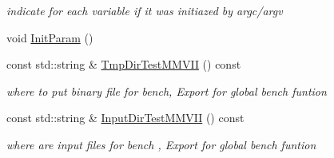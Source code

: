\begin{DoxyCompactItemize}
\begin{DoxyCompactList}\small\item\em indicate for each variable if it was initiazed by argc/argv \end{DoxyCompactList}\item 
void \hyperlink{classMMVII_1_1cMMVII__Appli_abaedc3d8b246bbfecae24dcd91c02589}{Init\+Param} ()
\item 
const std\+::string \& \hyperlink{classMMVII_1_1cMMVII__Appli_aa0285db0be33d2e945518cc77ae6186b}{Tmp\+Dir\+Test\+M\+M\+V\+II} () const \hypertarget{classMMVII_1_1cMMVII__Appli_aa0285db0be33d2e945518cc77ae6186b}{}\label{classMMVII_1_1cMMVII__Appli_aa0285db0be33d2e945518cc77ae6186b}

\begin{DoxyCompactList}\small\item\em where to put binary file for bench, Export for global bench funtion \end{DoxyCompactList}\item 
const std\+::string \& \hyperlink{classMMVII_1_1cMMVII__Appli_a645eb112bf1672030cbc66229cfefb70}{Input\+Dir\+Test\+M\+M\+V\+II} () const \hypertarget{classMMVII_1_1cMMVII__Appli_a645eb112bf1672030cbc66229cfefb70}{}\label{classMMVII_1_1cMMVII__Appli_a645eb112bf1672030cbc66229cfefb70}

\begin{DoxyCompactList}\small\item\em where are input files for bench , Export for global bench funtion \end{DoxyCompactList}\end{DoxyCompactItemize}
